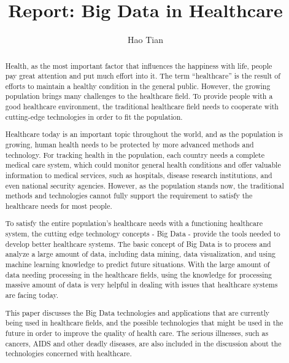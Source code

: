 
\title{Report: Big Data in Healthcare}

\author{Hao Tian}


\renewcommand{\shortauthors}{H. Tian.}


\begin{abstract}
Health, as the most important factor that influences 
the happiness with life, 
people pay great attention and put much effort into it. 
The term ``healthcare'' is the 
result of efforts to maintain a healthy condition in the 
general public. 
However, the growing population brings many challenges to 
the healthcare field. To provide people with a good  
healthcare environment, the traditional healthcare field 
needs to cooperate with 
cutting-edge technologies in order to fit the population. 

Healthcare today is an important topic throughout the world, and as 
the population is growing, human health needs 
to be protected by more advanced methods and technology. For tracking 
health in the population, each country needs a complete medical 
care system, which could monitor general health conditions and offer 
valuable information to medical services, such as 
hospitals, disease research institutions, and even national security agencies. 
However, as the population stands now, the traditional 
methods and technologies cannot fully support the requirement to
satisfy the healthcare needs for most people.

To satisfy the entire population's healthcare needs with a functioning 
healthcare system, the cutting edge technology concepts - Big Data - 
provide the tools needed to develop better healthcare systems. 
The basic concept of Big Data is to process and analyze a large amount 
of data, including data mining, data visualization, and using machine 
learning knowledge to predict  future situations. With the large amount of 
data needing processing in the healthcare fields, using the knowledge for 
processing massive amount of data is very helpful in dealing with 
issues that healthcare systems are facing today. 

This paper discusses the Big Data technologies and applications that 
are currently being used in healthcare fields, and the possible technologies 
that might be used in the future in order to improve the quality of health 
care. The serious illnesses, such as cancers, AIDS and other deadly 
diseases, are also included in the discussion about the technologies 
concerned with healthcare. 
\end{abstract} 

